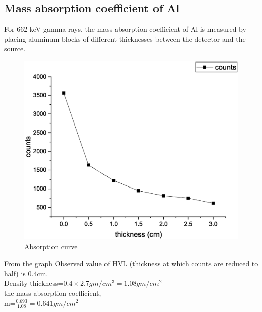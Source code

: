 	\subsection{Mass absorption coefficient of Al}
		For 662 keV gamma rays, the mass absorption coefficient of Al is measured by placing aluminum blocks of different thicknesses between the detector and the source.\\
		
		\begin{figure}[H]
			\centering
			\includegraphics[width=0.9\columnwidth]{images/Graph6.eps}
			\caption{Absorption curve}
		\end{figure}
		From the graph Observed value of HVL (thickness at which counts are reduced to half) is 0.4cm.\\
		Density thickness=\(0.4\times 2.7gm/cm^3 =1.08gm/cm^2\)\\
		the mass absorption coefficient,\\
		m=\(\frac{0.693}{1.08} =0.641gm/cm^2\)
